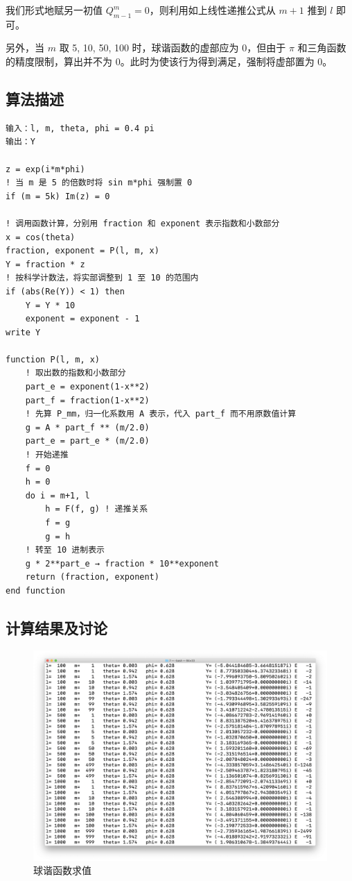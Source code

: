 \documentclass{ctexart}
\begin{document}
我们形式地赋另一初值 $Q_{m-1}^m=0$，则利用如上线性递推公式从 $m+1$ 推到 $l$ 即可。

另外，当 $m$ 取 5, 10, 50, 100 时，球谐函数的虚部应为 0，但由于 $\pi$ 和三角函数的精度限制，算出并不为 0。此时为使该行为得到满足，强制将虚部置为 0。
\subsection{算法描述}
\begin{lstlisting}
输入：l, m, theta, phi = 0.4 pi
输出：Y

z = exp(i*m*phi)
! 当 m 是 5 的倍数时将 sin m*phi 强制置 0
if (m = 5k) Im(z) = 0

! 调用函数计算，分别用 fraction 和 exponent 表示指数和小数部分
x = cos(theta)
fraction, exponent = P(l, m, x)
Y = fraction * z
! 按科学计数法，将实部调整到 1 至 10 的范围内
if (abs(Re(Y)) < 1) then
    Y = Y * 10
    exponent = exponent - 1
write Y

function P(l, m, x)
    ! 取出数的指数和小数部分
    part_e = exponent(1-x**2)
    part_f = fraction(1-x**2)
    ! 先算 P_mm，归一化系数用 A 表示，代入 part_f 而不用原数值计算
    g = A * part_f ** (m/2.0)
    part_e = part_e * (m/2.0)
    ! 开始递推
    f = 0
    h = 0
    do i = m+1, l
        h = F(f, g) ! 递推关系
        f = g
        g = h
    ! 转至 10 进制表示
    g * 2**part_e → fraction * 10**exponent
    return (fraction, exponent)
end function
\end{lstlisting}
\subsection{计算结果及讨论}

\begin{figure}[h]
\centering
\includegraphics[scale = 0.27]{harmonics.png}
\caption{球谐函数求值}
\end{figure}
\end{document}
